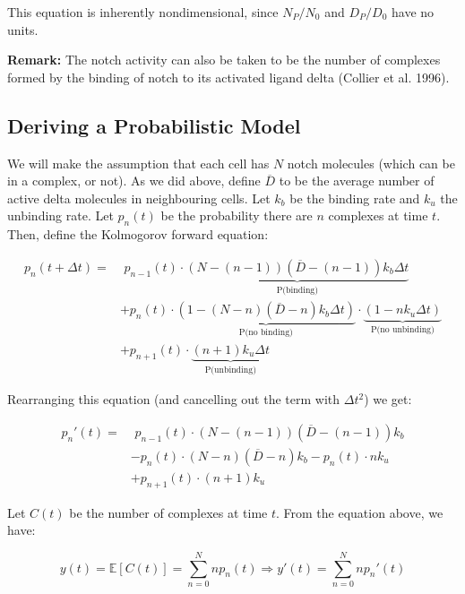 \documentclass{article}
\begin{document}
\begin{flushleft}
This equation is inherently nondimensional, since $N_{P} / N_{0}$ and $D_{P} / D_{0}$ have no units.

\medskip

\textbf{Remark:} The notch activity can also be taken to be the number of complexes formed by the binding of notch to its activated ligand delta (Collier et al. 1996).

\newpage

\subsection{Deriving a Probabilistic Model}

We will make the assumption that each cell has $N$ notch molecules (which can be in a complex, or not). As we did above, define $\overline{D}$ to be the average number of active delta molecules in neighbouring cells. Let $k_{b}$ be the binding rate and $k_{u}$ the unbinding rate. Let $p_{n}(t)$ be the probability there are $n$ complexes at time $t$. Then, define the Kolmogorov forward equation:

$$
\begin{aligned}
  p_{n}(t + \Delta t)= &\,\,p_{n-1}(t) \cdot \underbrace{(N - (n - 1))(\overline{D} - (n - 1)) k_{b} \Delta t}_{\text{P(binding)}}  \\[5pt]
                      &+ p_{n}(t) \cdot \underbrace{(1 - (N - n)(\overline{D} - n)k_{b}\Delta t)}_{\text{P(no binding)}} \cdot \underbrace{(1 - n k_{u} \Delta t)}_{\text{P(no unbinding)}} \\[5pt]
                      &+ p_{n+1}(t) \cdot \underbrace{(n + 1)k_{u}\Delta t}_{\text{P(unbinding)}}
\end{aligned}
$$

Rearranging this equation (and cancelling out the term with $\Delta t^2$) we get: 

$$
\begin{aligned}
p_{n}'(t) = &\,\,p_{n-1}(t) \cdot (N - (n - 1))(\overline{D} - (n - 1)) k_{b} \\[5pt]
            &-p_{n}(t)\cdot (N-n)(\overline{D} - n)k_{b} - p_{n}(t) \cdot n k_{u} \\[5pt]
            &+ p_{n+1}(t) \cdot (n + 1)k_{u}
\end{aligned}
$$

Let $C(t)$ be the number of complexes at time $t$. From the equation above, we have:

$$
y(t) = \mathbb{E}[C(t)] = \sum_{n = 0}^{N} np_{n}(t) \Rightarrow y'(t) = \sum_{n = 0}^{N} np_{n}'(t)
$$


\end{flushleft}
\end{document}
